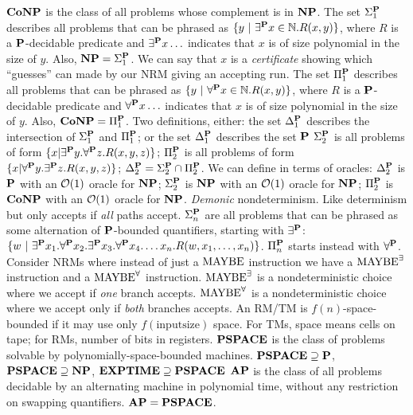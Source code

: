 \wde{$\CoNP$} $\CoNP$ is the class of all problems whose complement is in $\NP$.
 The set $\sigp{1}$ describes all problems that can be phrased as $\{y\ |\ \exists^{\Pc} x \in \mathbb{N}. R(x,y)\}$, where $R$ is a $\Pc$-decidable predicate and $\exists^{\Pc}x \ldots$ indicates that $x$ is of size polynomial in the size of $y$. Also, $\NP = \sigp{1}$.
 We can say that $x$ is a \emph{certificate} showing which ``guesses'' can made by our NRM giving an accepting run.
 The set $\pip{1}$ describes all problems that can be phrased as $\{y\ |\ \forall^{\Pc} x \in \mathbb{N}. R(x,y)\}$, where $R$ is a $\Pc$-decidable predicate and $\forall^{\Pc}x \ldots$ indicates that $x$ is of size polynomial in the size of $y$. Also, $\CoNP = \pip{1}$.
 Two definitions, either: the set $\delp{1}$ describes the intersection of $\sigp{1}$ and $\pip{1}$; or the set $\delp{1}$ describes the set $\Pc$
 $\sigp{2}$ is all problems of form $\{x | \exists^{\Pc}y.\forall^{\Pc}z. R(x,y,z)\}$;
$\pip{2}$ is all problems of form $\{x | \forall^{\Pc}y.\exists^{\Pc}z. R(x,y,z)\}$; $\delp{2} = \sigp{2} \cap \pip{2}$.
 We can define in terms of oracles:
$\delp{2}$ is $\Pc$ with an $\bO(1)$ oracle for $\NP$;
$\sigp{2}$ is $\NP$ with an $\bO(1)$ oracle for $\NP$;
$\pip{2}$ is $\CoNP$ with an $\bO(1)$ oracle for $\NP$.
 \emph{Demonic} nondeterminism. Like determinism but only accepts if \emph{all} paths accept.
 $\sigp{n}$ are all problems that can be phrased as some alternation of $\Pc$-bounded quantifiers, starting with $\exists^{\Pc}$: 
$\{w\ |\ \exists^{\Pc}x_1.\forall^{\Pc}x_2.\exists^{\Pc}x_3.\forall^{\Pc}x_4.\ldots x_n.R(w,x_1,\ldots,x_n)\}$.
$\pip{n}$ starts instead with $\forall^{\Pc}$.
 Consider NRMs where instead of just a $\Mbe$ instruction we have a $\Mbee$ instruction and a $\Mbea$ instruction. 
$\Mbee$ is a nondeterministic choice where we accept if \emph{one} branch accepts. 
$\Mbea$ is a nondeterministic choice where we accept only if \emph{both} branches accepts. 
\wde{$\PSPACE$} An RM/TM is $f(n)$-space-bounded if it may use only $f(\mathrm{inputsize})$ space. For TMs, space means cells on tape; for RMs, number of bits in registers. 
$\PSPACE$ is the class of problems solvable by polynomially-space-bounded machines. $\PSPACE \supseteq \Pc$, $\PSPACE\supseteq \NP$, $\EXPTIME \supseteq \PSPACE$
\wde{$\AP$} $\AP$ is the class of all problems decidable by an alternating machine in polynomial time, without any restriction on swapping quantifiers. $\AP = \PSPACE$.